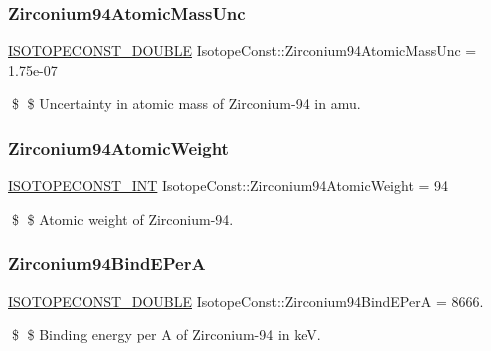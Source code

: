 \subsubsection{\texorpdfstring{Zirconium94\+Atomic\+Mass\+Unc}{Zirconium94AtomicMassUnc}}
{\footnotesize\ttfamily \mbox{\hyperlink{group___isotope_const-_macros_ga8f45a7272ce02c0b4c65c44636ed719a}{I\+S\+O\+T\+O\+P\+E\+C\+O\+N\+S\+T\+\_\+\+D\+O\+U\+B\+LE}} Isotope\+Const\+::\+Zirconium94\+Atomic\+Mass\+Unc = 1.\+75e-\/07}

\$ \$ Uncertainty in atomic mass of Zirconium-\/94 in amu. \mbox{\label{group___isotope_const-_zirconium-_zr94_ga764c51b2348569c7d6f151027d24d3dc}} 
\subsubsection{\texorpdfstring{Zirconium94\+Atomic\+Weight}{Zirconium94AtomicWeight}}
{\footnotesize\ttfamily \mbox{\hyperlink{group___isotope_const-_macros_ga5f18360b3e99483a35c32d789e62621c}{I\+S\+O\+T\+O\+P\+E\+C\+O\+N\+S\+T\+\_\+\+I\+NT}} Isotope\+Const\+::\+Zirconium94\+Atomic\+Weight = 94}

\$ \$ Atomic weight of Zirconium-\/94. \mbox{\label{group___isotope_const-_zirconium-_zr94_ga1617645ada80edec45dc95dff6874502}} 
\subsubsection{\texorpdfstring{Zirconium94\+Bind\+E\+PerA}{Zirconium94BindEPerA}}
{\footnotesize\ttfamily \mbox{\hyperlink{group___isotope_const-_macros_ga8f45a7272ce02c0b4c65c44636ed719a}{I\+S\+O\+T\+O\+P\+E\+C\+O\+N\+S\+T\+\_\+\+D\+O\+U\+B\+LE}} Isotope\+Const\+::\+Zirconium94\+Bind\+E\+PerA = 8666.}

\$ \$ Binding energy per A of Zirconium-\/94 in keV. \mbox{\label{group___isotope_const-_zirconium-_zr94_ga6e995150fce2f287f6d106beef766cda}} 
